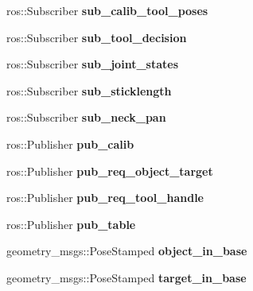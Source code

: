 \begin{DoxyCompactItemize}
\mbox{\label{structManipulate_a4c59a24c1a111a405a23a251b80d1f7d}} 
ros\+::\+Subscriber {\bfseries sub\+\_\+calib\+\_\+tool\+\_\+poses}
\item 
\mbox{\label{structManipulate_af670e455aec7e6ef5c39ea1377e6cafb}} 
ros\+::\+Subscriber {\bfseries sub\+\_\+tool\+\_\+decision}
\item 
\mbox{\label{structManipulate_ab0d061cb3ffbee5c2dedf25fa2f051c3}} 
ros\+::\+Subscriber {\bfseries sub\+\_\+joint\+\_\+states}
\item 
\mbox{\label{structManipulate_a04dccd769426f2e7fcf1853a405566bd}} 
ros\+::\+Subscriber {\bfseries sub\+\_\+sticklength}
\item 
\mbox{\label{structManipulate_a55ff2774266be06c06325057e8896332}} 
ros\+::\+Subscriber {\bfseries sub\+\_\+neck\+\_\+pan}
\item 
\mbox{\label{structManipulate_a3a84cb51c03ce67d92c061789c88339e}} 
ros\+::\+Publisher {\bfseries pub\+\_\+calib}
\item 
\mbox{\label{structManipulate_a730210ca90abfc07b6daaf39c048f99e}} 
ros\+::\+Publisher {\bfseries pub\+\_\+req\+\_\+object\+\_\+target}
\item 
\mbox{\label{structManipulate_a4951437e59496c8d6b71847244f08153}} 
ros\+::\+Publisher {\bfseries pub\+\_\+req\+\_\+tool\+\_\+handle}
\item 
\mbox{\label{structManipulate_a8d3234b33ad66804c2c5b5e78214b7dc}} 
ros\+::\+Publisher {\bfseries pub\+\_\+table}
\item 
\mbox{\label{structManipulate_a1ffc14a1069802dbf1a48693b2687e18}} 
geometry\+\_\+msgs\+::\+Pose\+Stamped {\bfseries object\+\_\+in\+\_\+base}
\item 
\mbox{\label{structManipulate_af160b74f81b44d762e3086920184e24e}} 
geometry\+\_\+msgs\+::\+Pose\+Stamped {\bfseries target\+\_\+in\+\_\+base}
\item 

\end{DoxyCompactItemize}
